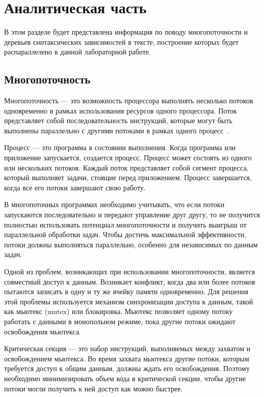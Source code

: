 \chapter{Аналитическая часть}
В этом разделе будет представлена информация по поводу многопоточности и деревьев синтаксических зависимостей в тексте, построение которых будет распараллелено в данной лабораторной работе.

\section{Многопоточность}

Многопоточность --- это возможность процессора выполнять несколько потоков одновременно в рамках использования ресурсов одного процессора. Поток представляет собой последовательность инструкций, которые могут быть выполнены параллельно с другими потоками в рамках одного процесс~\cite{threads}.

Процесс --- это программа в состоянии выполнения. Когда программа или приложение запускается, создается процесс. Процесс может состоять из одного или нескольких потоков. Каждый поток представляет собой сегмент процесса, который выполняет задачи, стоящие перед приложением. Процесс завершается, когда все его потоки завершают свою работу.

В многопоточных программах необходимо учитывать, что если потоки запускаются последовательно и передают управление друг другу, то не получится полностью использовать потенциал многопоточности и получить выигрыш от параллельной обработки задач. Чтобы достичь максимальной эффективности, потоки должны выполняться параллельно, особенно для независимых по данным задач.

Одной из проблем, возникающих при использовании многопоточности, является совместный доступ к данным. Возникает конфликт, когда два или более потоков пытаются записать в одну и ту же ячейку памяти одновременно. Для решения этой проблемы используется механизм синхронизации доступа к данным, такой как мьютекс (mutex) или блокировка. Мьютекс позволяет одному потоку работать с данными в монопольном режиме, пока другие потоки ожидают освобождения мьютекса.

Критическая секция --- это набор инструкций, выполняемых между захватом и освобождением мьютекса. Во время захвата мьютекса другие потоки, которым требуется доступ к общим данным, должны ждать его освобождения. Поэтому необходимо минимизировать объем кода в критической секции, чтобы другие потоки могли получить к ней доступ как можно быстрее.

